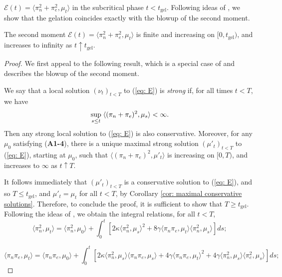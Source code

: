$\mathcal{E}(t)=\langle \pi_n^2+\pi_e^2, \mu_t\rangle$ in the subcritical phase $t<t_\mathrm{gel}$. Following ideas of \cite{N00}, we show that the gelation coincides exactly with the blowup of the second moment. \begin{lemma}\label{lemma: second moment before tgel} The second moment $\mathcal{E}(t)=\langle \pi_n^2+\pi_e^2, \mu_t\rangle$ is finite and increasing on $[0, t_\mathrm{gel})$, and increases to infinity as $t\uparrow t_\mathrm{gel}$. \end{lemma} \begin{proof} We first appeal to the following result, which is a special case of \cite[Theorem 2.1]{N00} and describes the blowup of the second moment. \begin{lemma} We say that a local solution $(\nu_t)_{t<T}$ to (\ref{eq: E}) is \emph{strong} if, for all times $t<T$, we have \begin{equation}
    \sup_{s\le t} \hspace{0.1cm} \langle( \pi_n+\pi_e)^2, \mu_s\rangle <\infty.
\end{equation} Then any strong local solution to (\ref{eq: E}) is also conservative. Moreover, for any $\mu_0$ satisfying (\textbf{A1-4}), there is a unique maximal strong solution $(\mu'_t)_{t<T}$ to (\ref{eq: E}), starting at $\mu_0$, such that $ \langle (\pi_n+\pi_e)^2, \mu'_t\rangle$ is increasing on $[0,T)$, and increases to $ \infty$  as $t\uparrow T$. \end{lemma} 

It follows immediately that $(\mu'_t)_{t<T}$ is a  conservative solution to (\ref{eq: E}), and so $T \le t_\mathrm{gel}$, and $\mu'_t=\mu_t$ for all $t<T$, by Corollary \ref{cor: maximal conservative solutions}. Therefore, to conclude the proof, it is sufficient to show that $T\ge t_\mathrm{gel}$. \medskip \\ Following the ideas of \cite[Proposition 2.7]{N00}, we obtain the integral relations, for all $t<T$, \begin{equation}
    \langle \pi_n^2, \mu_t\rangle =
    \langle \pi_n^2, \mu_0\rangle + \int_0^t \left[2\kappa\langle \pi_n^2, \mu_s\rangle^2+8\gamma\langle \pi_n\pi_e, \mu_t\rangle\langle\pi_n^2, \mu_s\rangle \right] ds;
\end{equation} 

\begin{equation}
    \langle \pi_n \pi_e, \mu_t\rangle =
    \langle \pi_n\pi_e, \mu_0\rangle + \int_0^t \left[2\kappa\langle \pi_n^2, \mu_s\rangle\langle \pi_n\pi_e, \mu_s\rangle+4\gamma\langle \pi_n\pi_e, \mu_t\rangle^2+4\gamma\langle\pi_n^2, \mu_s\rangle\langle \pi_e^2, \mu_s \rangle \right] ds;
\end{equation}


\end{proof}
